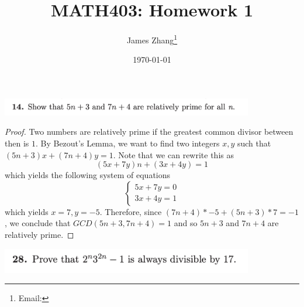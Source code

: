 \documentclass[12pt]{scrartcl}
\begin{document}
\title{MATH403: Homework 1}
\author{James Zhang\thanks{Email: }}
\date{\today}



\maketitle

\includegraphics[width=11cm]{14.png}

\begin{proof}
  Two numbers are relatively prime if the greatest common divisor between then is $1$. By Bezout's Lemma, 
  we want to find two integers $x, y$ such that $(5n + 3)x + (7n + 4)y = 1$. Note that we can rewrite this as 
  \[(5x + 7y)n + (3x + 4y) = 1\]
  which yields the following system of equations 
  \[\begin{cases}
    5x + 7y = 0\\
    3x + 4y = 1
  \end{cases}\]
  which yields $x = 7, y = -5$. Therefore, since $(7n + 4) * -5 + (5n + 3) * 7 = -1$, we conclude that 
  $GCD(5n + 3, 7n + 4) = 1$ and so $5n + 3$ and $7n + 4$ are relatively prime.
\end{proof}

\newpage

\includegraphics[width=11cm]{28.png}
\end{document}
